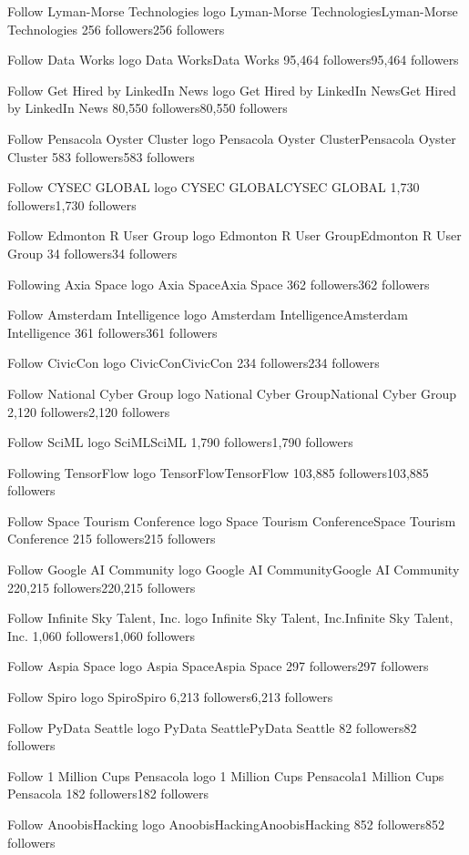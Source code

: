 Follow
Lyman-Morse Technologies logo
Lyman-Morse TechnologiesLyman-Morse Technologies
256 followers256 followers

Follow
Data Works logo
Data WorksData Works
95,464 followers95,464 followers

Follow
Get Hired by LinkedIn News logo
Get Hired by LinkedIn NewsGet Hired by LinkedIn News
80,550 followers80,550 followers

Follow
Pensacola Oyster Cluster logo
Pensacola Oyster ClusterPensacola Oyster Cluster
583 followers583 followers

Follow
CYSEC GLOBAL logo
CYSEC GLOBALCYSEC GLOBAL
1,730 followers1,730 followers

Follow
Edmonton R User Group logo
Edmonton R User GroupEdmonton R User Group
34 followers34 followers

Following
Axia Space logo
Axia SpaceAxia Space
362 followers362 followers

Follow
Amsterdam Intelligence logo
Amsterdam IntelligenceAmsterdam Intelligence
361 followers361 followers

Follow
CivicCon logo
CivicConCivicCon
234 followers234 followers

Follow
National Cyber Group logo
National Cyber GroupNational Cyber Group
2,120 followers2,120 followers

Follow
SciML logo
SciMLSciML
1,790 followers1,790 followers

Following
TensorFlow logo
TensorFlowTensorFlow
103,885 followers103,885 followers

Follow
Space Tourism Conference logo
Space Tourism ConferenceSpace Tourism Conference
215 followers215 followers

Follow
Google AI Community logo
Google AI CommunityGoogle AI Community
220,215 followers220,215 followers

Follow
Infinite Sky Talent, Inc. logo
Infinite Sky Talent, Inc.Infinite Sky Talent, Inc.
1,060 followers1,060 followers

Follow
Aspia Space logo
Aspia SpaceAspia Space
297 followers297 followers

Follow
Spiro logo
SpiroSpiro
6,213 followers6,213 followers

Follow
PyData Seattle logo
PyData SeattlePyData Seattle
82 followers82 followers

Follow
1 Million Cups Pensacola logo
1 Million Cups Pensacola1 Million Cups Pensacola
182 followers182 followers

Follow
AnoobisHacking logo
AnoobisHackingAnoobisHacking
852 followers852 followers

